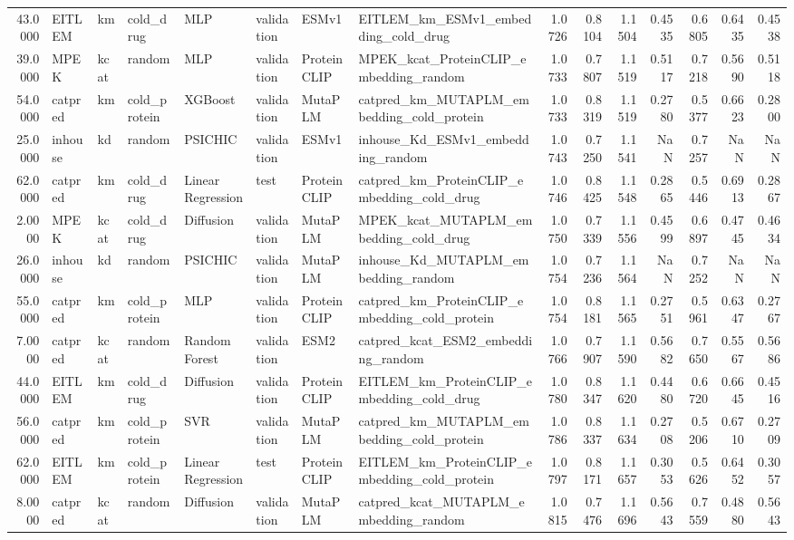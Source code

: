 \begin{tabular}{rlllllllrrrrrrr}
43.0000 & EITLEM & km & cold_drug & MLP & validation & ESMv1 & EITLEM_km_ESMv1_embedding_cold_drug & 1.0726 & 0.8104 & 1.1504 & 0.4535 & 0.6805 & 0.6435 & 0.4538 \\
39.0000 & MPEK & kcat & random & MLP & validation & ProteinCLIP & MPEK_kcat_ProteinCLIP_embedding_random & 1.0733 & 0.7807 & 1.1519 & 0.5117 & 0.7218 & 0.5690 & 0.5118 \\
54.0000 & catpred & km & cold_protein & XGBoost & validation & MutaPLM & catpred_km_MUTAPLM_embedding_cold_protein & 1.0733 & 0.8319 & 1.1519 & 0.2780 & 0.5377 & 0.6623 & 0.2800 \\
25.0000 & inhouse & kd & random & PSICHIC & validation & ESMv1 & inhouse_Kd_ESMv1_embedding_random & 1.0743 & 0.7250 & 1.1541 & NaN & 0.7257 & NaN & NaN \\
62.0000 & catpred & km & cold_drug & Linear Regression & test & ProteinCLIP & catpred_km_ProteinCLIP_embedding_cold_drug & 1.0746 & 0.8425 & 1.1548 & 0.2865 & 0.5446 & 0.6913 & 0.2867 \\
2.0000 & MPEK & kcat & cold_drug & Diffusion & validation & MutaPLM & MPEK_kcat_MUTAPLM_embedding_cold_drug & 1.0750 & 0.7339 & 1.1556 & 0.4599 & 0.6897 & 0.4745 & 0.4634 \\
26.0000 & inhouse & kd & random & PSICHIC & validation & MutaPLM & inhouse_Kd_MUTAPLM_embedding_random & 1.0754 & 0.7236 & 1.1564 & NaN & 0.7252 & NaN & NaN \\
55.0000 & catpred & km & cold_protein & MLP & validation & ProteinCLIP & catpred_km_ProteinCLIP_embedding_cold_protein & 1.0754 & 0.8181 & 1.1565 & 0.2751 & 0.5961 & 0.6347 & 0.2767 \\
7.0000 & catpred & kcat & random & Random Forest & validation & ESM2 & catpred_kcat_ESM2_embedding_random & 1.0766 & 0.7907 & 1.1590 & 0.5682 & 0.7650 & 0.5567 & 0.5686 \\
44.0000 & EITLEM & km & cold_drug & Diffusion & validation & ProteinCLIP & EITLEM_km_ProteinCLIP_embedding_cold_drug & 1.0780 & 0.8347 & 1.1620 & 0.4480 & 0.6720 & 0.6645 & 0.4516 \\
56.0000 & catpred & km & cold_protein & SVR & validation & MutaPLM & catpred_km_MUTAPLM_embedding_cold_protein & 1.0786 & 0.8337 & 1.1634 & 0.2708 & 0.5206 & 0.6710 & 0.2709 \\
62.0000 & EITLEM & km & cold_protein & Linear Regression & test & ProteinCLIP & EITLEM_km_ProteinCLIP_embedding_cold_protein & 1.0797 & 0.8171 & 1.1657 & 0.3053 & 0.5626 & 0.6452 & 0.3057 \\
8.0000 & catpred & kcat & random & Diffusion & validation & MutaPLM & catpred_kcat_MUTAPLM_embedding_random & 1.0815 & 0.7476 & 1.1696 & 0.5643 & 0.7559 & 0.4880 & 0.5643 \\

\end{tabular}
